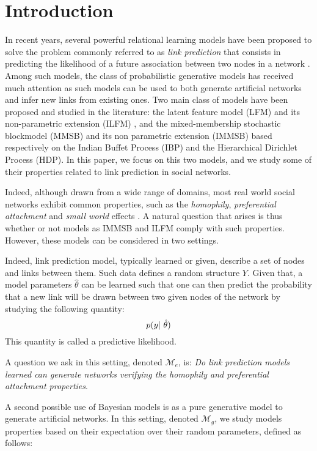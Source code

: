 \section{Introduction}
\label{sec:introduction}
In recent years, several powerful relational learning models have been proposed to solve the problem commonly referred to as \textit{link prediction} that consists in predicting the likelihood of a future association between two nodes in a network \cite{Liben-Nowell07, HassanZaki11}. Among such models, the class of probabilistic generative models has received much attention as such models can be used to both generate artificial networks and infer new links from existing ones. Two main class of models have been proposed and studied in the literature: the latent feature model (LFM) \cite{BMF} and its non-parametric extension (ILFM) \cite{ILFRM}, and the mixed-membership stochastic blockmodel (MMSB) \cite{MMSB} and its non parametric extension (IMMSB) \cite{iMMSB,diMMSB} based respectively on the Indian Buffet Process (IBP) and the Hierarchical Dirichlet Process (HDP). In this paper, we focus on this two models, and we study some of their properties related to link prediction in social networks. 

Indeed, although drawn from a wide range of domains, most real world social networks exhibit common properties, such as the \textit{homophily}, \textit{preferential attachment} and \textit{small world} effects \cite{Newman2010, Barabasi2003}. A natural question that arises is thus whether or not models as IMMSB and ILFM comply with such properties. However, these models can be considered in two settings. 


Indeed, link prediction model, typically learned or given, describe a set of nodes and links between them. Such data defines a random structure $Y$. Given that, a model parameters $\hat \theta$ can be learned such that one can then predict the probability that a new link will be drawn between two given nodes of the network by studying the following quantity:
\begin{equation}
\p(y | \hat \theta)
\end{equation}
This quantity is called a predictive likelihood.


A question we ask in this setting, denoted $\mathcal{M}_e$, is: \textit{Do link prediction models learned can generate networks verifying the homophily and preferential attachment properties}.

A second possible use of Bayesian models is as a pure generative model to generate artificial networks. In this setting, denoted $\mathcal{M}_g$, we study models properties based on their expectation over their random parameters, defined as follows:

